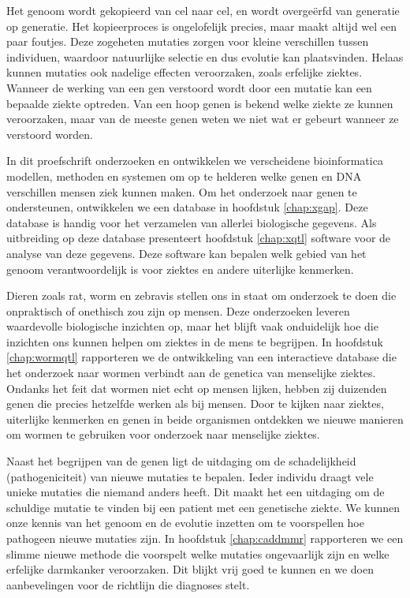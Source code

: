 \begin{appendices}
	Het genoom wordt gekopieerd van cel naar cel, en wordt overgeërfd van generatie op generatie.
	Het kopieerproces is ongelofelijk precies, maar maakt altijd wel een paar foutjes.
	Deze zogeheten mutaties zorgen voor kleine verschillen tussen individuen, waardoor natuurlijke selectie en dus evolutie kan plaatsvinden.
	Helaas kunnen mutaties ook nadelige effecten veroorzaken, zoals erfelijke ziektes.
	Wanneer de werking van een gen verstoord wordt door een mutatie kan een bepaalde ziekte optreden.
	Van een hoop genen is bekend welke ziekte ze kunnen veroorzaken, maar van de meeste genen weten we niet wat er gebeurt wanneer ze verstoord worden.
	
	In dit proefschrift onderzoeken en ontwikkelen we verscheidene bioinformatica modellen, methoden en systemen om op te helderen welke genen en DNA verschillen mensen ziek kunnen maken.
	Om het onderzoek naar genen te ondersteunen, ontwikkelen we een database in hoofdstuk \ref{chap:xgap}.
	Deze database is handig voor het verzamelen van allerlei biologische gegevens.
	Als uitbreiding op deze database presenteert hoofdstuk \ref{chap:xqtl} software voor de analyse van deze gegevens.
	Deze software kan bepalen welk gebied van het genoom verantwoordelijk is voor ziektes en andere uiterlijke kenmerken.
	
	Dieren zoals rat, worm en zebravis stellen ons in staat om onderzoek te doen die onpraktisch of onethisch zou zijn op mensen.
	Deze onderzoeken leveren waardevolle biologische inzichten op, maar het blijft vaak onduidelijk hoe die inzichten ons kunnen helpen om ziektes in de mens te begrijpen.
	In hoofdstuk \ref{chap:wormqtl} rapporteren we de ontwikkeling van een interactieve database die het onderzoek naar wormen verbindt aan de genetica van menselijke ziektes.
	Ondanks het feit dat wormen niet echt op mensen lijken, hebben zij duizenden genen die precies hetzelfde werken als bij mensen.
	Door te kijken naar ziektes, uiterlijke kenmerken en genen in beide organismen ontdekken we nieuwe manieren om wormen te gebruiken voor onderzoek naar menselijke ziektes.
	
	Naast het begrijpen van de genen ligt de uitdaging om de schadelijkheid (pathogeniciteit) van nieuwe mutaties te bepalen.
	Ieder individu draagt vele unieke mutaties die niemand anders heeft.
	Dit maakt het een uitdaging om de schuldige mutatie te vinden bij een patient met een genetische ziekte.
	We kunnen onze kennis van het genoom en de evolutie inzetten om te voorspellen hoe pathogeen nieuwe mutaties zijn.
	In hoofdstuk \ref{chap:caddmmr} rapporteren we een slimme nieuwe methode die voorspelt welke mutaties ongevaarlijk zijn en welke erfelijke darmkanker veroorzaken.
	Dit blijkt vrij goed te kunnen en we doen aanbevelingen voor de richtlijn die diagnoses stelt.
	

\end{appendices}
